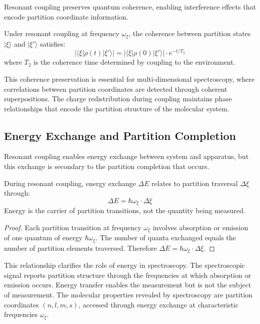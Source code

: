 Resonant coupling preserves quantum coherence, enabling interference effects that encode partition coordinate information.

\begin{theorem}
\label{thm:coherence}
Under resonant coupling at frequency $\omega_\xi$, the coherence between partition states $|\xi\rangle$ and $|\xi'\rangle$ satisfies:
\begin{equation}
|\langle \xi | \rho(t) | \xi' \rangle| = |\langle \xi | \rho(0) | \xi' \rangle| \cdot e^{-t/T_2}
\end{equation}
where $T_2$ is the coherence time determined by coupling to the environment.
\end{theorem}

This coherence preservation is essential for multi-dimensional spectroscopy, where correlations between partition coordinates are detected through coherent superpositions. The charge redistribution during coupling maintains phase relationships that encode the partition structure of the molecular system.

\subsection{Energy Exchange and Partition Completion}

Resonant coupling enables energy exchange between system and apparatus, but this exchange is secondary to the partition completion that occurs.

\begin{theorem}
\label{thm:energy_partition}
During resonant coupling, energy exchange $\Delta E$ relates to partition traversal $\Delta\xi$ through:
\begin{equation}
\Delta E = \hbar \omega_\xi \cdot \Delta\xi
\end{equation}
Energy is the carrier of partition transitions, not the quantity being measured.
\end{theorem}

\begin{proof}
Each partition transition at frequency $\omega_\xi$ involves absorption or emission of one quantum of energy $\hbar\omega_\xi$. The number of quanta exchanged equals the number of partition elements traversed. Therefore $\Delta E = \hbar\omega_\xi \cdot \Delta\xi$.
\end{proof}

This relationship clarifies the role of energy in spectroscopy. The spectroscopic signal reports partition structure through the frequencies at which absorption or emission occurs. Energy transfer enables the measurement but is not the subject of measurement. The molecular properties revealed by spectroscopy are partition coordinates $(n, l, m, s)$, accessed through energy exchange at characteristic frequencies $\omega_\xi$.
